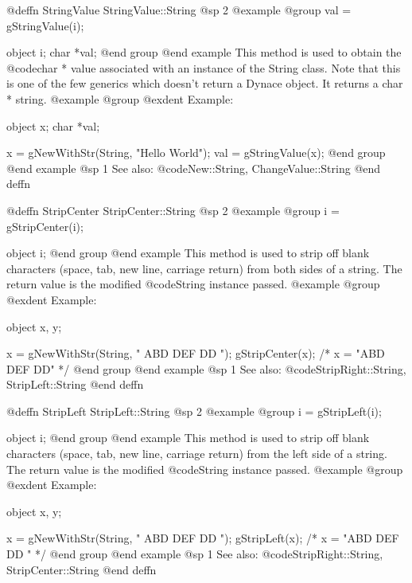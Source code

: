 @deffn {StringValue} StringValue::String
@sp 2
@example
@group
val = gStringValue(i);

object  i;
char    *val;
@end group
@end example
This method is used to obtain the @code{char *} value associated with an
instance of the String class.  Note that this is one of the few
generics which doesn't return a Dynace object.  It returns a char * string.
@example
@group
@exdent Example:

object  x;
char    *val;

x = gNewWithStr(String, "Hello World");
val = gStringValue(x);
@end group
@end example
@sp 1
See also:  @code{New::String, ChangeValue::String}
@end deffn






@deffn {StripCenter} StripCenter::String
@sp 2
@example
@group
i = gStripCenter(i);

object  i;
@end group
@end example
This method is used to strip off blank characters (space, tab, new line,
carriage return) from both sides of a string.  The return value is the
modified @code{String} instance passed.
@example
@group
@exdent Example:

object  x, y;

x = gNewWithStr(String, "    ABD  DEF  DD    ");
gStripCenter(x);   /*  x = "ABD  DEF  DD"    */
@end group
@end example
@sp 1
See also:  @code{StripRight::String, StripLeft::String}
@end deffn












@deffn {StripLeft} StripLeft::String
@sp 2
@example
@group
i = gStripLeft(i);

object  i;
@end group
@end example
This method is used to strip off blank characters (space, tab, new line,
carriage return) from the left side of a string.  The return value is the
modified @code{String} instance passed.
@example
@group
@exdent Example:

object  x, y;

x = gNewWithStr(String, "    ABD  DEF  DD    ");
gStripLeft(x);   /*  x = "ABD  DEF  DD    "    */
@end group
@end example
@sp 1
See also:  @code{StripRight::String, StripCenter::String}
@end deffn










